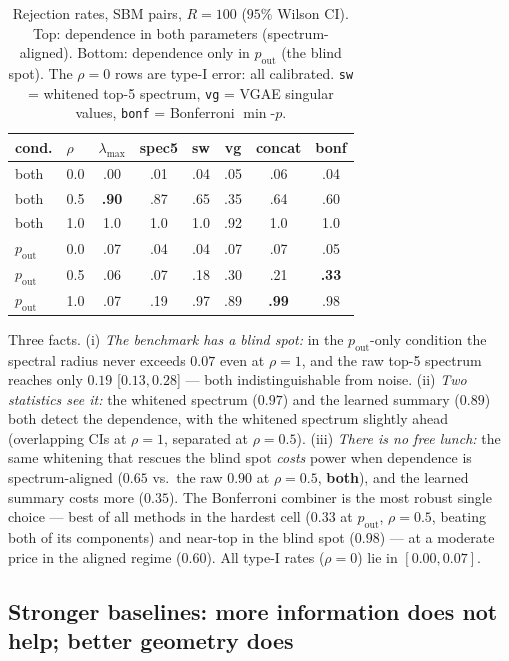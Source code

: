 \documentclass[11pt]{article}
\begin{document}
\begin{table}[ht]
\centering
\small
\caption{Rejection rates, SBM pairs, $R = 100$ ($95\%$ Wilson CI). Top:
dependence in both parameters (spectrum-aligned). Bottom: dependence only in
$p_{\mathrm{out}}$ (the blind spot). The $\rho = 0$ rows are type-I error: all
calibrated. \texttt{sw} = whitened top-5 spectrum, \texttt{vg} = VGAE singular
values, \texttt{bonf} = Bonferroni $\min$-$p$.}
\label{tab:sbm}
\begin{tabular}{llcccccc}
\toprule
cond. & $\rho$ & $\lambda_{\max}$ & spec5 & sw & vg & concat & bonf \\
\midrule
both & 0.0 & .00 & .01 & .04 & .05 & .06 & .04 \\
both & 0.5 & \textbf{.90} & .87 & .65 & .35 & .64 & .60 \\
both & 1.0 & 1.0 & 1.0 & 1.0 & .92 & 1.0 & 1.0 \\
\addlinespace
$p_{\mathrm{out}}$ & 0.0 & .07 & .04 & .04 & .07 & .07 & .05 \\
$p_{\mathrm{out}}$ & 0.5 & .06 & .07 & .18 & .30 & .21 & \textbf{.33} \\
$p_{\mathrm{out}}$ & 1.0 & .07 & .19 & .97 & .89 & \textbf{.99} & .98 \\
\bottomrule
\end{tabular}
\end{table}

Three facts. (i) \emph{The benchmark has a blind spot:} in the
$p_{\mathrm{out}}$-only condition the spectral radius never exceeds $0.07$ even
at $\rho = 1$, and the raw top-5 spectrum reaches only $0.19$
\mbox{[$0.13, 0.28$]} --- both indistinguishable from noise. (ii) \emph{Two
statistics see it:} the whitened spectrum ($0.97$) and the learned summary
($0.89$) both detect the dependence, with the whitened spectrum slightly ahead
(overlapping CIs at $\rho = 1$, separated at $\rho = 0.5$). (iii) \emph{There
is no free lunch:} the same whitening that rescues the blind spot \emph{costs}
power when dependence is spectrum-aligned ($0.65$ vs.\ the raw $0.90$ at
$\rho = 0.5$, \textbf{both}), and the learned summary costs more ($0.35$). The
Bonferroni combiner is the most robust single choice --- best of all methods in
the hardest cell ($0.33$ at $p_{\mathrm{out}}$, $\rho = 0.5$, beating both of
its components) and near-top in the blind spot ($0.98$) --- at a moderate price
in the aligned regime ($0.60$). All type-I rates ($\rho = 0$) lie in
$[0.00, 0.07]$.

\subsection{Stronger baselines: more information does not help; better geometry does}
\label{sec:killorconfirm}
\end{document}
